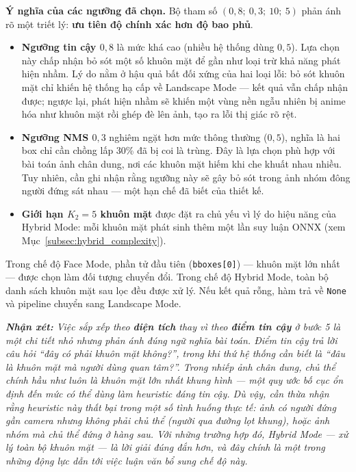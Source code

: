 \textbf{Ý nghĩa của các ngưỡng đã chọn.} Bộ tham số $(0{,}8;\ 0{,}3;\ 10;\ 5)$ phản ánh rõ một triết lý: \textbf{ưu tiên độ chính xác hơn độ bao phủ}.

\begin{itemize}
    \item \textbf{Ngưỡng tin cậy $0{,}8$} là mức khá cao (nhiều hệ thống dùng $0{,}5$). Lựa chọn này chấp nhận bỏ sót một số khuôn mặt để gần như loại trừ khả năng phát hiện nhầm. Lý do nằm ở hậu quả bất đối xứng của hai loại lỗi: bỏ sót khuôn mặt chỉ khiến hệ thống hạ cấp về Landscape Mode --- kết quả vẫn chấp nhận được; ngược lại, phát hiện nhầm sẽ khiến một vùng nền ngẫu nhiên bị anime hóa như khuôn mặt rồi ghép đè lên ảnh, tạo ra lỗi thị giác rõ rệt.
    \item \textbf{Ngưỡng NMS $0{,}3$} nghiêm ngặt hơn mức thông thường ($0{,}5$), nghĩa là hai box chỉ cần chồng lấp 30\% đã bị coi là trùng. Đây là lựa chọn phù hợp với bài toán ảnh chân dung, nơi các khuôn mặt hiếm khi che khuất nhau nhiều. Tuy nhiên, cần ghi nhận rằng ngưỡng này sẽ gây bỏ sót trong ảnh nhóm đông người đứng sát nhau --- một hạn chế đã biết của thiết kế.
    \item \textbf{Giới hạn $K_2 = 5$ khuôn mặt} được đặt ra chủ yếu vì lý do hiệu năng của Hybrid Mode: mỗi khuôn mặt phát sinh thêm một lần suy luận ONNX (xem Mục~\ref{subsec:hybrid_complexity}).
\end{itemize}

Trong chế độ Face Mode, phần tử đầu tiên (\texttt{bboxes[0]}) --- khuôn mặt lớn nhất --- được chọn làm đối tượng chuyển đổi. Trong chế độ Hybrid Mode, toàn bộ danh sách khuôn mặt sau lọc đều được xử lý. Nếu kết quả rỗng, hàm trả về \texttt{None} và pipeline chuyển sang Landscape Mode.

\medskip
\noindent\textit{\textbf{Nhận xét:} Việc sắp xếp theo \textbf{diện tích} thay vì theo \textbf{điểm tin cậy} ở bước 5 là một chi tiết nhỏ nhưng phản ánh đúng ngữ nghĩa bài toán. Điểm tin cậy trả lời câu hỏi ``\textit{đây có phải khuôn mặt không?}'', trong khi thứ hệ thống cần biết là ``\textit{đâu là khuôn mặt mà người dùng quan tâm?}''. Trong nhiếp ảnh chân dung, chủ thể chính hầu như luôn là khuôn mặt lớn nhất khung hình --- một quy ước bố cục ổn định đến mức có thể dùng làm heuristic đáng tin cậy. Dù vậy, cần thừa nhận rằng heuristic này thất bại trong một số tình huống thực tế: ảnh có người đứng gần camera nhưng không phải chủ thể (người qua đường lọt khung), hoặc ảnh nhóm mà chủ thể đứng ở hàng sau. Với những trường hợp đó, Hybrid Mode --- xử lý toàn bộ khuôn mặt --- là lời giải đúng đắn hơn, và đây chính là một trong những động lực dẫn tới việc luận văn bổ sung chế độ này.}

